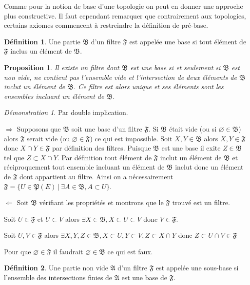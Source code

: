 \documentclass[a4paper, 11pt, french]{book}
\newenvironment{itemise}{\itemize}{\enditemize}
\theoremstyle{plain} %
\newtheorem{proposition}{Proposition}
\theoremstyle{definition} %
\newtheorem{definition}{Définition}
\theoremstyle{remark} %
\newtheorem*{demonstration}{Démonstration}
\newcommand{\1}{\mathds{1}}
\newcommand\vide{\varnothing}
\renewcommand{\frak}[1]{\mathfrak{#1}}
\newcommand\ens[2]{\{#1 \ |\ #2\}}
\newcommand\equivalence[3]{
	\begin{demonstration}
		#1
		\begin{itemise}
			\item[$\Longrightarrow$] #2
			\item[$\Longleftarrow$] #3
		\end{itemise}
	\end{demonstration}
}
\begin{document}
Comme pour la notion de base d'une topologie on peut en donner une approche plus constructive.
Il faut cependant remarquer que contrairement aux topologies, certains axiomes commencent à restreindre la définition de pré-base.

\begin{definition}
	Une partie $\frak{B}$ d'un filtre $\frak{F}$ est appelée une base si tout élément de $\frak{F}$ inclus un élément de $\frak{B}$.
\end{definition}

\begin{proposition}
	Il existe un filtre dont $\frak{B}$ est une base si et seulement si $\frak{B}$ est non vide, ne contient pas l'ensemble vide et l'intersection de deux éléments de $\frak{B}$ inclut un élément de $\frak{B}$.
	Ce filtre est alors unique et ses éléments sont les ensembles incluant un élément de $\frak{B}$.
\end{proposition}

\equivalence{Par double implication.}{
	Supposons que $\frak{B}$ soit une base d'un filtre $\frak{F}$.
	Si $\frak{B}$ était vide (ou si $\vide\in\frak{B}$) alors $\frak{F}$ serait vide (ou $\vide\in\frak{F}$) ce qui est impossible.
	Soit $X, Y\in\frak{B}$ alors $X, Y\in\frak{F}$ donc $X\cap Y\in\frak{F}$ par définition des filtres.
	Puisque $\frak{B}$ est une base il exite $Z\in\frak{B}$ tel que $Z\subset X\cap Y$.
	Par définition tout élément de $\frak{F}$ inclut un élément de $\frak{B}$ et réciproquement tout ensemble incluant un élément de $\frak{B}$ inclut donc un élément de $\frak{F}$ dont appartient au filtre.
	Ainsi on a nécessairement $\frak{F}=\ens{U\in\frak{P}(E)}{\exists A\in\frak{B}, A\subset U}$.
}{
	Soit $\frak{B}$ vérifiant les propriétés et montrons que le $\frak{F}$ trouvé est un filtre.
	\begin{itemise}
		\item Soit $U\in\frak{F}$ et $U\subset V$ alors $\exists X\in\frak{B}, X\subset U\subset V$ donc $V\in\frak{F}$.
		\item Soit $U, V\in\frak{F}$ alors $\exists X, Y, Z\in\frak{B}, X\subset U, Y\subset V, Z\subset X\cap Y$ donc $Z\subset U\cap V\in\frak{F}$
		\item Pour que $\vide\in\frak{F}$ il faudrait $\vide\in\frak{B}$ ce qui est faux.
	\end{itemise}
}

\begin{definition}
	Une partie non vide $\frak{A}$ d'un filtre $\frak{F}$ est appelée une sous-base si l'ensemble des intersections finies de $\frak{A}$ est une base de $\frak{F}$.
\end{definition}
\end{document}
